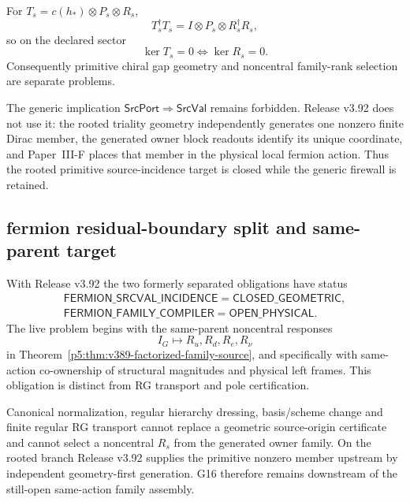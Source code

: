 \documentclass[12pt,a4paper]{article}
\begin{document}
\begin{corollary}
\label{p5:cor:v389-family-factor-gap-criterion}
For $T_s=c(h_*)\otimes P_s\otimes R_s$,
\[
 T_s^\dagger T_s=I\otimes P_s\otimes R_s^\dagger R_s,
\]
so on the declared sector
\[
 \boxed{\ker T_s=0\iff\ker R_s=0.}
\]
Consequently primitive chiral gap geometry and noncentral family-rank
selection are separate problems.
\end{corollary}

\begin{remark}
\label{p5:rem:v389-open-srcval-incidence}
The generic implication
$\mathsf{SrcPort}\Rightarrow\mathsf{SrcVal}$ remains forbidden.  Release
v3.92 does not use it: the rooted triality geometry independently generates
one nonzero finite Dirac member, the generated owner block readouts identify
its unique coordinate, and Paper~III-F places that member in the physical
local fermion action.  Thus the rooted primitive source-incidence target is
closed while the generic firewall is retained.
\end{remark}


\subsection{fermion residual-boundary split and same-parent target}
\label{p5:sec:v390-fermion-residual-boundary-split}

\begin{definition}
\label{p5:def:v390-two-fermion-obligations}
With Release v3.92 the two formerly separated obligations have status
\[
 \begin{gathered}
 \boxed{\mathsf{FERMION\_SRCVAL\_INCIDENCE}=\mathsf{CLOSED\_GEOMETRIC}},\\[4pt]
 \boxed{\mathsf{FERMION\_FAMILY\_COMPILER}=\mathsf{OPEN\_PHYSICAL}}.
 \end{gathered}
\]
The live problem begins with the same-parent noncentral responses
\[
 I_G\longmapsto R_u,R_d,R_e,R_\nu
\]
in Theorem~\ref{p5:thm:v389-factorized-family-source}, and specifically with
same-action co-ownership of structural magnitudes and physical left frames.
This obligation is distinct from RG transport and pole certification.
\end{definition}

\begin{proposition}
\label{p5:prop:v390-no-downstream-source-repair}
Canonical normalization, regular hierarchy dressing, basis/scheme change and
finite regular RG transport cannot replace a geometric source-origin
certificate and cannot select a noncentral $R_s$ from the generated owner
family.  On the rooted branch Release v3.92 supplies the primitive nonzero
member upstream by independent geometry-first generation.  G16 therefore
remains downstream of the still-open same-action family assembly.
\end{proposition}
\end{document}
